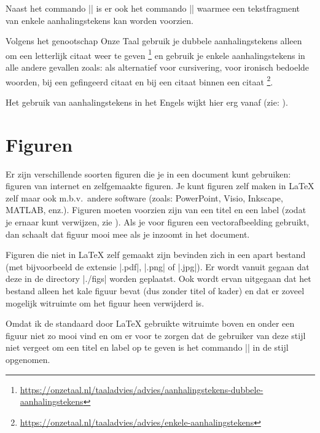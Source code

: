 Naast het commando |\dquote| is er ook het commando |\squote| waarmee een tekstfragment van enkele aanhalingstekens kan worden voorzien.

Volgens het genootschap Onze Taal gebruik je dubbele aanhalingstekens alleen om een letterlijk citaat weer te geven%
\footnote{%
    \url{https://onzetaal.nl/taaladvies/advies/aanhalingstekens-dubbele-aanhalingstekens}%
} en gebruik je enkele aanhalingstekens in alle andere gevallen zoals: als alternatief voor cursivering, voor ironisch bedoelde woorden,
bij een gefingeerd citaat en bij een citaat binnen een citaat%
\footnote{%
    \url{https://onzetaal.nl/taaladvies/advies/enkele-aanhalingstekens}%
}.

Het gebruik van aanhalingstekens in het Engels wijkt hier erg vanaf (zie: ).

\section{Figuren}
\label{sec:figuren}
Er zijn verschillende soorten figuren die je in een document kunt gebruiken: figuren van internet en zelfgemaakte figuren.
Je kunt figuren zelf maken in \LaTeX{} zelf maar ook m.b.v.\ andere software (zoals: PowerPoint, Visio, Inkscape, MATLAB, enz.).
Figuren moeten voorzien zijn van een titel en een label (zodat je ernaar kunt verwijzen, zie ).
Als je voor figuren een vectorafbeelding gebruikt, dan schaalt dat figuur mooi mee als je inzoomt in het document.

Figuren die niet in \LaTeX{} zelf gemaakt zijn bevinden zich in een apart bestand (met bijvoorbeeld de extensie |.pdf|, |.png| of |.jpg|).
Er wordt vanuit gegaan dat deze in de directory |./figs| worden geplaatst.
Ook wordt ervan uitgegaan dat het bestand alleen het kale figuur bevat (dus zonder titel of kader) en dat er zoveel mogelijk witruimte om het figuur heen verwijderd is.

Omdat ik de standaard door \LaTeX{} gebruikte witruimte boven en onder een figuur niet zo mooi vind en om er voor te zorgen dat de gebruiker van deze stijl niet vergeet om
een titel en label op te geven is het commando |\figuur| in de stijl opgenomen.

